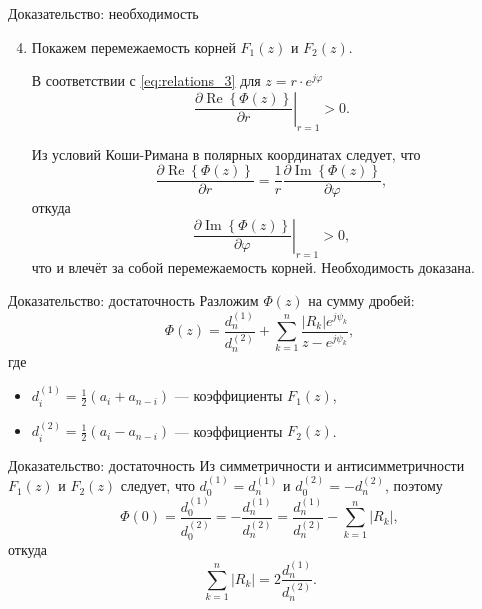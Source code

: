 \documentclass[notheorems,aspectratio=169]{beamer}
\theoremstyle{definition}
\newcommand{\abs}[1]{\left| #1 \right|}
\newcommand{\paren}[1]{\left( #1 \right)}
\renewcommand{\Re}{\operatorname{Re}}
\renewcommand{\Im}{\operatorname{Im}}
\begin{document}
\begin{frame}{Доказательство: необходимость}
  \begin{enumerate}
    \setcounter{enumi}{3}
  \item Покажем перемежаемость корней $F_1(z)$ и $F_2(z)$.

    В соответствии с \eqref{eq:relations_3} для $z = r \cdot e^{j\varphi}$
    \begin{equation*}
      \left. \frac{\partial \Re \left\{ \Phi(z) \right\}}{\partial r} \right|_{r=1} > 0.
    \end{equation*}

    Из условий Коши-Римана в полярных координатах следует, что
    \begin{equation*}
      \frac{\partial \Re \left\{ \Phi(z) \right\}}{\partial r} = \frac{1}{r} \frac{\partial \Im\left\{ \Phi(z) \right\}}{\partial \varphi},
    \end{equation*}
    откуда
    \begin{equation*}
      \left. \frac{\partial \Im\left\{ \Phi(z) \right\}}{\partial \varphi} \right|_{r=1} > 0,
    \end{equation*}
    что и влечёт за собой перемежаемость корней. Необходимость доказана.
  \end{enumerate}
\end{frame}

\begin{frame}{Доказательство: достаточность}
  Разложим $\Phi(z)$ на сумму дробей:
  \begin{equation*}
    \Phi(z) = \frac{d_n^{(1)}}{d_n^{(2)}} + \sum_{k=1}^n \frac{\abs{R_k} e^{j \psi_k}}{z - e^{j \psi_k}},
  \end{equation*}
  где
  \begin{itemize}
  \item $d_i^{(1)} = \frac{1}{2}\paren{a_i + a_{n - i}}$ --- коэффициенты $F_1(z)$,
  \item $d_i^{(2)} = \frac{1}{2}\paren{a_i - a_{n - i}}$ --- коэффициенты $F_2(z)$.
  \end{itemize}
\end{frame}

\begin{frame}{Доказательство: достаточность}
  Из симметричности и антисимметричности $F_1(z)$ и $F_2(z)$ следует, что $d_0^{(1)} = d_n^{(1)}$ и $d_0^{(2)} = -d_n^{(2)}$,
  поэтому
  \begin{equation*}
    \Phi(0) = \frac{d_0^{(1)}}{d_0^{(2)}} = -\frac{d_n^{(1)}}{d_n^{(2)}} = \frac{d_n^{(1)}}{d_n^{(2)}} - \sum_{k=1}^n \abs{R_k},
  \end{equation*}
  откуда
  \begin{equation*}
    \sum_{k=1}^n \abs{R_k} = 2 \frac{d_n^{(1)}}{d_n^{(2)}}.
  \end{equation*}
\end{frame}
\end{document}
